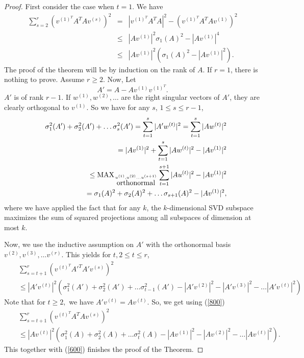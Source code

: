 \documentclass{book}
\numberwithin{exercise}{chapter}
\begin{document}
\begin{proof} First consider the case when $t=1$. We have
 \begin{eqnarray}
\sum_{s=2}^r(v^{(1)^T}A^TAv^{(s)})^2 &=& |v^{(1)^T}A^TA|^2- (v^{(1)^T}A^TAv^{(1)})^2\nonumber\\
&\leq& |Av^{(1)}|^2\sigma_1(A)^2-|Av^{(1)}|^4\nonumber\\
&\leq& |Av^{(1)}|^2(\sigma_1(A)^2-|Av^{(1)}|^2)\label{600}.
\end{eqnarray}
The proof of the theorem will be by induction on the rank of $A$. If $r=1$, there is nothing to prove.
Assume $r\geq 2$.
Now, Let
$$A'=A-Av^{(1)}v^{(1)^T}.$$
$A'$ is of rank $r-1$.
If $w^{(1)},w^{(2)},\ldots $ are the right singular vectors of $A'$, they are clearly orthogonal to $v^{(1)}$.
So we have for any $s$, $1\leq s\leq r-1$,
\begin{eqnarray}
&&\sigma_1^2(A')+\sigma_2^2(A')+\ldots \sigma_s^2(A') =\sum_{t=1}^s|A'w^{(t)}|^2 =\sum_{t=1}^s|Aw^{(t)}|^2\nonumber\\
&& \quad= |Av^{(1)}|^2+\sum_{t=1}^s|Aw^{(t)}|^2-|Av^{(1)}|^2\nonumber\\
&&\quad\leq \hbox{MAX}_{u^{(1)},u^{(2)}\ldots u^{(s+1)}\atop \hbox{orthonormal}} \sum_{t=1}^{s+1}|Au^{(t)}|^2-|Av^{(1)}|^2\nonumber\\
&&\quad =\sigma_1(A)^2+\sigma_2(A)^2+\ldots \sigma_{s+1}(A)^2-|Av^{(1)}|^2\label{800},
\end{eqnarray}
where we have applied the fact that for any $k$, the $k$-dimensional SVD subspace maximizes the sum of squared projections among all subspaces of dimension at most $k$.

Now, we use the inductive assumption on $A'$ with the orthonormal basis
$v^{(2)},v^{(3)},\ldots v^{(r)}$. This yields for $t, 2\leq t\leq r$,
\begin{eqnarray*}
&&\sum_{s=t+1}^{r}( v^{(t)^T}A'^TA'v^{(s)})^2\\
&&\le |A'v^{(t)}|^2(\sigma^2_1(A')+\sigma^2_2(A')+\ldots \sigma_{t-1}^2(A')
-|A'v^{(2)}|^2-|A'v^{(3)}|^2-\ldots |A'v^{(t)}|^2)
\end{eqnarray*}
Note that for $t\geq 2,$ we have $A'v^{(t)}=Av^{(t)}$. So, we get using
(\ref{800})
\begin{eqnarray*}
&&\sum_{s=t+1}^{r}( v^{(t)^T}A^TAv^{(s)})^2\\
&&\le|Av^{(t)}|^2(\sigma^2_1(A)+\sigma^2_2(A)+\ldots \sigma_{t}^2(A)
-|Av^{(1)}|^2-|Av^{(2)}|^2-\ldots |Av^{(t)}|^2).
\end{eqnarray*}
This together with (\ref{600}) finishes the proof of the Theorem. %
\end{proof}
\end{document}
